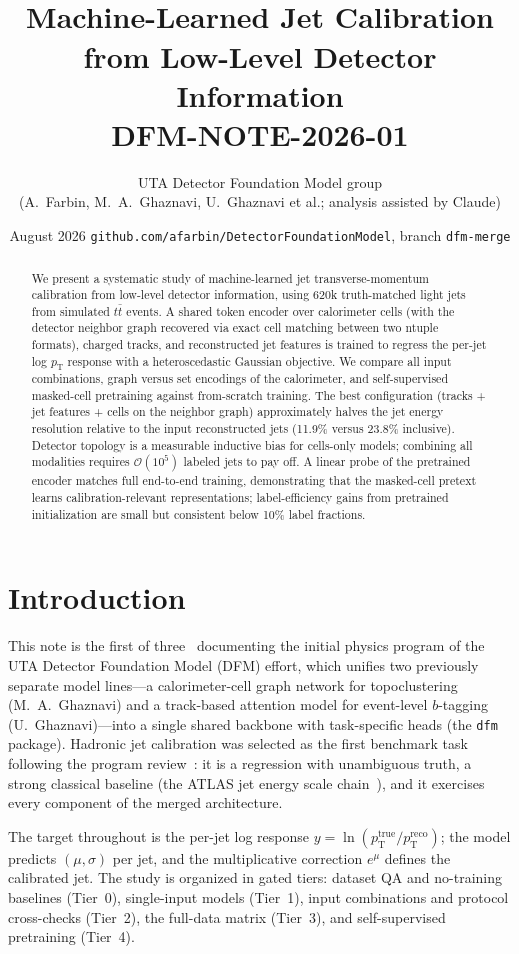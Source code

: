 \documentclass[11pt]{article}
\title{\vspace{-1.2cm}{\color{red!70!black}\small\bfseries INTERNAL DRAFT --- UTA DFM GROUP --- NOT AN OFFICIAL ATLAS DOCUMENT}\\[2mm]
\Large Machine-Learned Jet \pt{} Calibration from Low-Level Detector Information\\[1mm]
\normalsize DFM-NOTE-2026-01}
\author{\small UTA Detector Foundation Model group\\
\small (A.~Farbin, M.~A.~Ghaznavi, U.~Ghaznavi et al.; analysis assisted by Claude)}
\date{\small August 2026 \;\textbullet\; \texttt{github.com/afarbin/DetectorFoundationModel}, branch \texttt{dfm-merge}}
\newcommand{\pt}{\ensuremath{p_\mathrm{T}}}
\newcommand{\pttrue}{\ensuremath{p_\mathrm{T}^\mathrm{true}}}
\newcommand{\ptreco}{\ensuremath{p_\mathrm{T}^\mathrm{reco}}}
\begin{document}
\maketitle

\begin{abstract}
We present a systematic study of machine-learned jet transverse-momentum calibration
from low-level detector information, using 620k truth-matched light jets from simulated
$t\bar t$ events. A shared token encoder over calorimeter cells (with the detector
neighbor graph recovered via exact cell matching between two ntuple formats), charged
tracks, and reconstructed jet features is trained to regress the per-jet log \pt{}
response with a heteroscedastic Gaussian objective. We compare all input combinations,
graph versus set encodings of the calorimeter, and self-supervised masked-cell
pretraining against from-scratch training. The best configuration (tracks + jet
features + cells on the neighbor graph) approximately halves the jet energy resolution
relative to the input reconstructed jets (11.9\% versus 23.8\% inclusive). Detector
topology is a measurable inductive bias for cells-only models; combining all modalities
requires $\mathcal{O}(10^5)$ labeled jets to pay off. A linear probe of the pretrained
encoder matches full end-to-end training, demonstrating that the masked-cell pretext
learns calibration-relevant representations; label-efficiency gains from pretrained
initialization are small but consistent below 10\% label fractions.
\end{abstract}

\section{Introduction}
This note is the first of three~\cite{note2,note3} documenting the initial physics
program of the UTA Detector Foundation Model (DFM) effort, which unifies two previously
separate model lines---a calorimeter-cell graph network for topoclustering
(M.~A.~Ghaznavi) and a track-based attention model for event-level $b$-tagging
(U.~Ghaznavi)---into a single shared backbone with task-specific heads (the
\texttt{dfm} package). Hadronic jet calibration was selected as the first benchmark
task following the program review~\cite{reviews}: it is a regression with unambiguous
truth, a strong classical baseline (the ATLAS jet energy scale chain~\cite{topoclus}),
and it exercises every component of the merged architecture.

The target throughout is the per-jet log response
$y=\ln(\pttrue/\ptreco)$; the model predicts $(\mu,\sigma)$ per jet, and the
multiplicative correction $e^{\mu}$ defines the calibrated jet. The study is organized
in gated tiers: dataset QA and no-training baselines (Tier~0), single-input models
(Tier~1), input combinations and protocol cross-checks (Tier~2), the full-data matrix
(Tier~3), and self-supervised pretraining (Tier~4).
\end{document}
